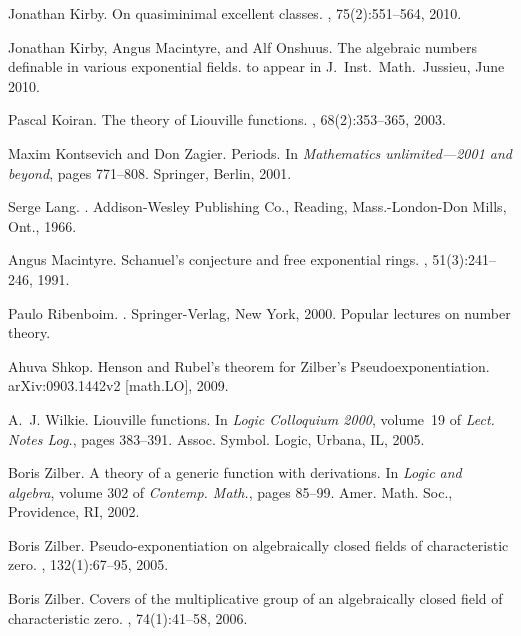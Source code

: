 \documentclass[12pt]{amsart}
\theoremstyle{definition}
\begin{document}
\begin{thebibliography}{10}
Jonathan Kirby.
\newblock On quasiminimal excellent classes.
, 75(2):551--564, 2010.

Jonathan Kirby, Angus Macintyre, and Alf Onshuus.
\newblock The algebraic numbers definable in various exponential fields.
\newblock to appear in J.\ Inst.\ Math.\ Jussieu, June 2010.

Pascal Koiran.
\newblock The theory of {L}iouville functions.
, 68(2):353--365, 2003.

Maxim Kontsevich and Don Zagier.
\newblock Periods.
\newblock In {\em Mathematics unlimited---2001 and beyond}, pages 771--808.
  Springer, Berlin, 2001.

Serge Lang.
.
\newblock Addison-Wesley Publishing Co., Reading, Mass.-London-Don Mills, Ont.,
  1966.

Angus Macintyre.
\newblock Schanuel's conjecture and free exponential rings.
, 51(3):241--246, 1991.

Paulo Ribenboim.
.
\newblock Springer-Verlag, New York, 2000.
\newblock Popular lectures on number theory.

Ahuva Shkop.
\newblock Henson and {R}ubel's theorem for {Z}ilber's {P}seudoexponentiation.
\newblock arXiv:0903.1442v2 [math.LO], 2009.

A.~J. Wilkie.
\newblock Liouville functions.
\newblock In {\em Logic {C}olloquium 2000}, volume~19 of {\em Lect. Notes
  Log.}, pages 383--391. Assoc. Symbol. Logic, Urbana, IL, 2005.

Boris Zilber.
\newblock A theory of a generic function with derivations.
\newblock In {\em Logic and algebra}, volume 302 of {\em Contemp. Math.}, pages
  85--99. Amer. Math. Soc., Providence, RI, 2002.

Boris Zilber.
\newblock Pseudo-exponentiation on algebraically closed fields of
  characteristic zero.
, 132(1):67--95, 2005.

Boris Zilber.
\newblock Covers of the multiplicative group of an algebraically closed field
  of characteristic zero.
, 74(1):41--58, 2006.

\end{thebibliography}
\end{document}
